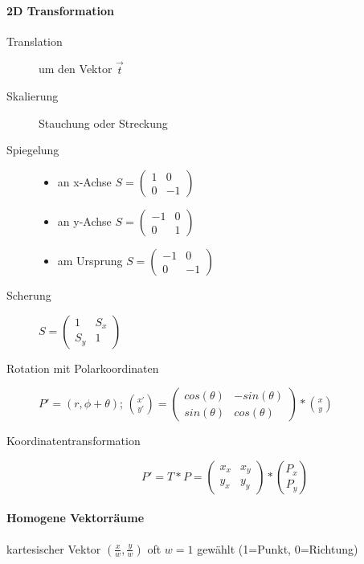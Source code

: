 \documentclass[10pt,landscape]{article}
\begin{document}
\begin{multicols}{3}
  \paragraph*{2D Transformation}
  \begin{description}
    \item[Translation] um den Vektor $\vec{t}$
    \item[Skalierung] Stauchung oder Streckung
    \item[Spiegelung]
          \begin{itemize}
            \item an x-Achse $S=\begin{pmatrix} 1 & 0 \\ 0 & -1 \end{pmatrix}$
            \item an y-Achse $S=\begin{pmatrix} -1 & 0 \\ 0 & 1 \end{pmatrix}$
            \item am Ursprung $S=\begin{pmatrix} -1 & 0 \\ 0 & -1 \end{pmatrix}$
          \end{itemize}
    \item[Scherung] $S=\begin{pmatrix} 1 & S_x \\ S_y & 1 \end{pmatrix}$
    \item[Rotation mit Polarkoordinaten] $P'=(r,\phi+\theta)$; $\binom{x'}{y'}=\begin{pmatrix} cos(\theta) & -sin(\theta) \\ sin(\theta) & cos(\theta)\end{pmatrix}*\binom{x}{y}$
    \item[Koordinatentransformation] $$P' =T*P = \begin{pmatrix} x_x & x_y\\ y_x & y_y \end{pmatrix} * \binom{P_x}{P_y}$$
  \end{description}
  
  \paragraph*{Homogene Vektorräume}
  kartesischer Vektor $(\frac{x}{w},\frac{y}{w})$ oft $w=1$ gewählt (1=Punkt, 0=Richtung)
  

\end{multicols}
\end{document}
